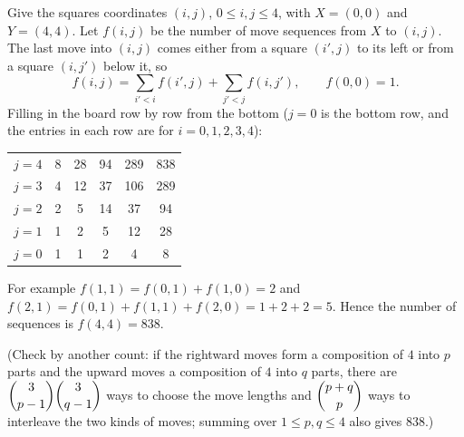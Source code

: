 Give the squares coordinates $(i,j)$, $0\le i,j\le4$, with $X=(0,0)$ and $Y=(4,4)$. Let $f(i,j)$ be the number of move sequences from $X$ to $(i,j)$. The last move into $(i,j)$ comes either from a square $(i',j)$ to its left or from a square $(i,j')$ below it, so
\[f(i,j)=\sum_{i'<i}f(i',j)+\sum_{j'<j}f(i,j'),\qquad f(0,0)=1 .\]
Filling in the board row by row from the bottom ($j=0$ is the bottom row, and the entries in each row are for $i=0,1,2,3,4$):
\begin{center}
\begin{tabular}{c|ccccc}
$j=4$ & 8 & 28 & 94 & 289 & 838\\
$j=3$ & 4 & 12 & 37 & 106 & 289\\
$j=2$ & 2 & 5 & 14 & 37 & 94\\
$j=1$ & 1 & 2 & 5 & 12 & 28\\
$j=0$ & 1 & 1 & 2 & 4 & 8
\end{tabular}
\end{center}
For example $f(1,1)=f(0,1)+f(1,0)=2$ and $f(2,1)=f(0,1)+f(1,1)+f(2,0)=1+2+2=5$. Hence the number of sequences is $f(4,4)=\boxed{838}$.

(Check by another count: if the rightward moves form a composition of $4$ into $p$ parts and the upward moves a composition of $4$ into $q$ parts, there are $\dbinom{3}{p-1}\dbinom{3}{q-1}$ ways to choose the move lengths and $\dbinom{p+q}{p}$ ways to interleave the two kinds of moves; summing over $1\le p,q\le4$ also gives $838$.)
